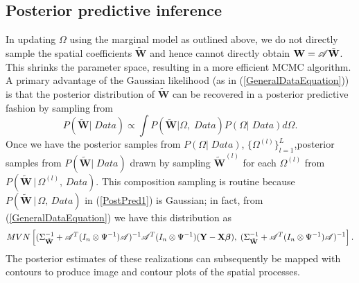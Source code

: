 \documentclass[a4paper]{article}
\newcommand{\bbeta}{ \mbox{\boldmath $ \beta $} }
\newcommand{\bW}{\textbf{W}}
\newcommand{\bX}{\textbf{X}}
\newcommand{\bY}{\textbf{Y}}
\begin{document}
\subsection{Posterior predictive inference}\label{postPred}

In updating $\Omega$ using the marginal model as outlined above, we
do not directly sample the spatial coefficients $\tilde{\bW}$ and
hence cannot directly obtain $\bW = {\cal A}\tilde{\bW}$. This
shrinks the parameter space, resulting in a more efficient MCMC
algorithm. A primary advantage of the Gaussian likelihood
(as in (\ref{GeneralDataEquation})) is that the posterior
distribution of $\tilde{\bW}$ can be recovered in a posterior
predictive fashion by sampling from
\begin{equation}\label{PostPred1}
P(\tilde{\bW} |\; Data) \propto \int P(\tilde{\bW} | \Omega,\;
Data)P(\Omega |\; Data)d\Omega.
\end{equation}
Once we have the posterior samples from $P(\Omega |\; Data)$,
$\{\Omega^{(l)}\}_{l=1}^{L}$,posterior samples
from $P(\tilde{\bW} |\; Data)$ drawn by sampling
$\tilde{\bW}^{(l)}$ for each $\Omega^{(l)}$ from $P(\tilde{\bW}\,|\,
\Omega^{(l)},\, Data)$. This composition sampling is routine because
$P(\tilde{\bW}\,|\,\Omega,\, Data)$ in (\ref{PostPred1}) is
Gaussian; in fact, from (\ref{GeneralDataEquation}) we have this
distribution as
\[
MVN\left[(\Sigma_{\tilde{\bW}}^{-1}+{\cal
A}^{T}(I_n\otimes \Psi^{-1}){\cal A})^{-1}{\cal A}^{T}(I_n\otimes \Psi^{-1})(\bY -
\bX\bbeta),\;(\Sigma_{\tilde{\bW}}^{-1}+{\cal A}^{T}(I_n\otimes
\Psi^{-1}){\cal A})^{-1} \right].
\]
The posterior estimates of these realizations can subsequently be
mapped with contours to produce image and contour plots of the
spatial processes.
\end{document}
